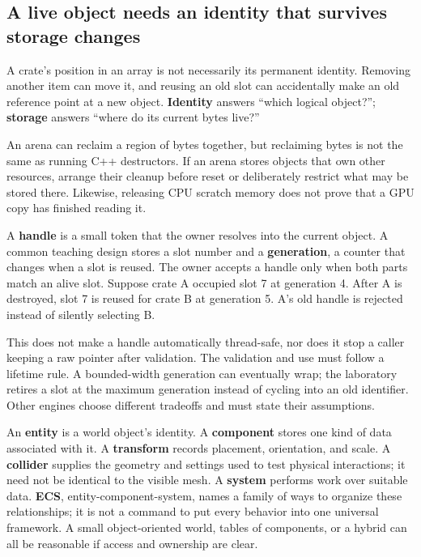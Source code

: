 \subsection{A live object needs an identity that survives storage changes}\label{05-engine-i-ch014-a-live-object-needs-an-identity-that-survives-storage-changes}

A crate's position in an array is not necessarily its permanent identity. Removing another item can move it, and reusing an old slot can accidentally make an old reference point at a new object. \textbf{Identity} answers ``which logical object?''; \textbf{storage} answers ``where do its current bytes live?''

An arena can reclaim a region of bytes together, but reclaiming bytes is not the same as running C++ destructors. If an arena stores objects that own other resources, arrange their cleanup before reset or deliberately restrict what may be stored there. Likewise, releasing CPU scratch memory does not prove that a GPU copy has finished reading it.

A \textbf{handle} is a small token that the owner resolves into the current object. A common teaching design stores a slot number and a \textbf{generation}, a counter that changes when a slot is reused. The owner accepts a handle only when both parts match an alive slot. Suppose crate A occupied slot 7 at generation 4. After A is destroyed, slot 7 is reused for crate B at generation 5. A's old handle is rejected instead of silently selecting B.

This does not make a handle automatically thread-safe, nor does it stop a caller keeping a raw pointer after validation. The validation and use must follow a lifetime rule. A bounded-width generation can eventually wrap; the laboratory retires a slot at the maximum generation instead of cycling into an old identifier. Other engines choose different tradeoffs and must state their assumptions.

An \textbf{entity} is a world object's identity. A \textbf{component} stores one kind of data associated with it. A \textbf{transform} records placement, orientation, and scale. A \textbf{collider} supplies the geometry and settings used to test physical interactions; it need not be identical to the visible mesh. A \textbf{system} performs work over suitable data. \textbf{ECS}, entity-component-system, names a family of ways to organize these relationships; it is not a command to put every behavior into one universal framework. A small object-oriented world, tables of components, or a hybrid can all be reasonable if access and ownership are clear.

